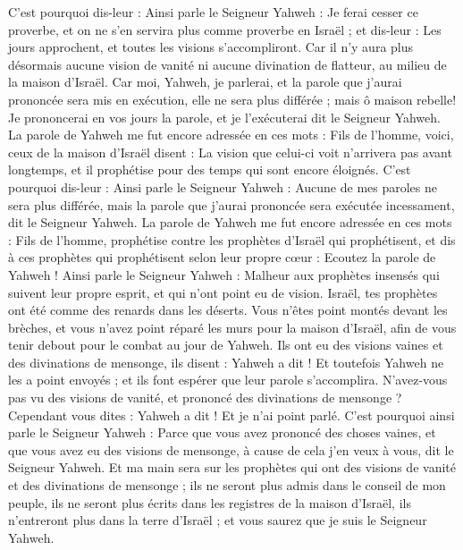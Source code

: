 \begin{multicols}{2}
C'est pourquoi dis-leur : Ainsi parle le Seigneur Yahweh : Je ferai cesser ce proverbe, et on ne s'en servira plus comme proverbe en Israël ; et dis-leur : Les jours approchent, et toutes les visions s'accompliront.
Car il n'y aura plus désormais aucune vision de vanité ni aucune divination de flatteur, au milieu de la maison d'Israël.
Car moi, Yahweh, je parlerai, et la parole que j'aurai prononcée sera mis en exécution, elle ne sera plus différée ; mais ô maison rebelle! Je prononcerai en vos jours la parole, et je l'exécuterai dit le Seigneur Yahweh.
La parole de Yahweh me fut encore adressée en ces mots :
Fils de l'homme, voici, ceux de la maison d'Israël disent : La vision que celui-ci voit n'arrivera pas avant longtemps, et il prophétise pour des temps qui sont encore éloignés.
C'est pourquoi dis-leur : Ainsi parle le Seigneur Yahweh : Aucune de mes paroles ne sera plus différée, mais la parole que j'aurai prononcée sera exécutée incessament, dit le Seigneur Yahweh.
\VerseOne{}La parole de Yahweh me fut encore adressée en ces mots :
Fils de l'homme, prophétise contre les prophètes d'Israël qui prophétisent, et dis à ces prophètes qui prophétisent selon leur propre cœur : Ecoutez la parole de Yahweh !
Ainsi parle le Seigneur Yahweh : Malheur aux prophètes insensés qui suivent leur propre esprit, et qui n'ont point eu de vision.
Israël, tes prophètes ont été comme des renards dans les déserts.
Vous n'êtes point montés devant les brèches, et vous n'avez point réparé les murs pour la maison d'Israël, afin de vous tenir debout pour le combat au jour de Yahweh.
Ils ont eu des visions vaines et des divinations de mensonge, ils disent : Yahweh a dit ! Et toutefois Yahweh ne les a point envoyés ; et ils font espérer que leur parole s'accomplira.
N'avez-vous pas vu des visions de vanité, et prononcé des divinations de mensonge ? Cependant vous dites : Yahweh a dit !  Et je n'ai point parlé.
C'est pourquoi ainsi parle le Seigneur Yahweh : Parce que vous avez prononcé des choses vaines, et que vous avez eu des visions de mensonge, à cause de cela j'en veux à vous, dit le Seigneur Yahweh.
Et ma main sera sur les prophètes qui ont des visions de vanité et des divinations de mensonge ; ils ne seront plus admis dans le conseil de mon peuple, ils ne seront plus écrits dans les registres de la maison d'Israël, ils n'entreront plus dans la terre d'Israël ; et vous saurez que je suis le Seigneur Yahweh.

\end{multicols}
